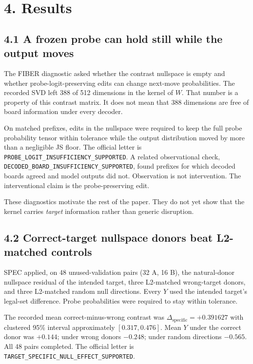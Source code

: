 \documentclass[11pt]{article}
\begin{document}
\section{4. Results}

\subsection{4.1 A frozen probe can hold still while the output moves}

The FIBER diagnostic asked whether the contrast nullspace is empty and whether probe-logit-preserving edits can change next-move probabilities. The recorded SVD left 388 of 512 dimensions in the kernel of \(W\). That number is a property of this contrast matrix. It does not mean that 388 dimensions are free of board information under every decoder.

On matched prefixes, edits in the nullspace were required to keep the full probe probability tensor within tolerance while the output distribution moved by more than a negligible JS floor. The official letter is \texttt{PROBE\_LOGIT\_INSUFFICIENCY\_SUPPORTED}. A related observational check, \texttt{DECODED\_BOARD\_INSUFFICIENCY\_SUPPORTED}, found prefixes for which decoded boards agreed and model outputs did not. Observation is not intervention. The interventional claim is the probe-preserving edit.

These diagnostics motivate the rest of the paper. They do not yet show that the kernel carries \emph{target} information rather than generic disruption.

\subsection{4.2 Correct-target nullspace donors beat L2-matched controls}

SPEC applied, on 48 unused-validation pairs (32 A, 16 B), the natural-donor nullspace residual of the intended target, three L2-matched wrong-target donors, and three L2-matched random null directions. Every \(Y\) used the intended target's legal-set difference. Probe probabilities were required to stay within tolerance.

The recorded mean correct-minus-wrong contrast was \(\Delta_{\mathrm{specific}}=+0.391627\) with clustered 95\% interval approximately \([0.317,0.476]\). Mean \(Y\) under the correct donor was \(+0.144\); under wrong donors \(-0.248\); under random directions \(-0.565\). All 48 pairs completed. The official letter is \texttt{TARGET\_SPECIFIC\_NULL\_EFFECT\_SUPPORTED}.
\end{document}
